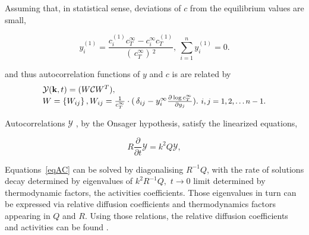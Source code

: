 \documentclass[../main.tex]{subfiles}
\begin{document}
Assuming that, in statistical sense, deviations of $c$ from the equilibrium values are small, %

\begin{equation}
  y_i^{(1)} = \frac{c_i^{(1)} c_T^{\infty }- c_i^{\infty }c_T^{(1)}}{( \, c_T^{\infty }) \,^2}, \ \sum_{i=1}^{n}  y_i^{(1)} =0.
\end{equation}

\noindent and thus autocorrelation functions of $y$ and  $c$ is are related by
\begin{equation}\begin{array}{l}
    \mathcal{Y} (\mathbf{k},t )= ( W \mathcal{C} W^T ),
    \\
W=\left\{ W_{ij} \right\}, W_{ij}  = \frac{1}{c_T^\infty }\cdot  ( \, \delta_{ij} -y_i^{\infty } \frac{\partial  \log  c_T^\infty}{\partial y_j} ). \ \mbox{\small $i,j  =1,2,\ldots n-1$}.

\end{array} \end{equation}
 
\noindent Autocorrelations $\mathcal{Y}$ , by the Onsager hypothesis, satisfy the linearized equations,

\begin{equation}
    R \frac{\partial }{\partial t} \mathcal{Y} = k^2 Q \mathcal{Y},
\label{eqAC}  
\end{equation}

Equations~\ref{eqAC}
can be solved by diagonalising $R^{-1} Q$, with the rate of solutions decay determined by eigenvalues of $k^2 R^{-1} Q,$ $t\rightarrow 0$ limit determined by thermodynamic factors, the activities coefficients. Those eigenvalues in turn can be expressed via relative diffusion coefficients and thermodynamics factors appearing in $Q$ and $R.$ Using those relations, the relative diffusion coefficients and activities can be found \cite{mwn2015}.

\end{document}
